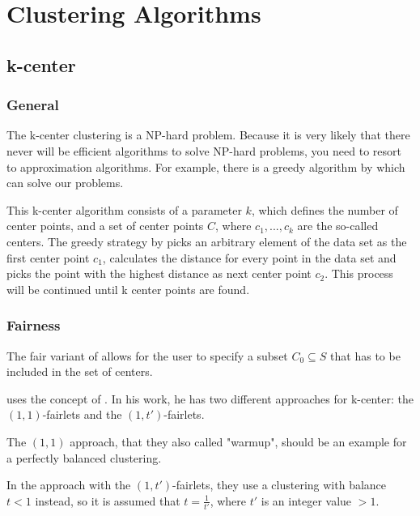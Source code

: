 \section{Clustering Algorithms}
\label{clustering-algorithms}


\subsection{k-center}
\label{k-center}

\subsubsection{General}
The k-center clustering is a NP-hard problem. Because it is very likely that there never will be efficient algorithms to solve NP-hard problems, you need to resort to approximation algorithms.
For example, there is a greedy algorithm by \textcite[]{Gonzalez1985ClusteringDistance} which can solve our problems.

This k-center algorithm consists of a parameter $k$, which defines the number of center points, and a set of center points $C$, where $c_{1},...,c_{k}$ are the so-called centers. \autocite[]{Kleindessner2019FairSummarization}
The greedy strategy by \textcite[]{Gonzalez1985ClusteringDistance} picks an arbitrary element of the data set as the first center point $c_{1}$, calculates the distance for every point in the data set and picks the point with the highest distance as next center point $c_{2}$. This process will be continued until k center points are found.

\subsubsection{Fairness}

The fair variant of \textcite[]{Kleindessner2019FairSummarization} allows for the user to specify a subset $C_{0} \subseteq S$ that has to be included in the set of centers.

\textcite[]{Chierichetti2018} uses the concept of . In his work, he has two different approaches for k-center: the $(1,1)$-fairlets and the $(1,t')$-fairlets.

The $(1,1)$ approach, that they also called "warmup", should be an example for a perfectly balanced clustering. \autocite[6]{Chierichetti2018}

In the approach with the $(1,t')$-fairlets, they use a clustering with balance $t < 1$ instead, so it is assumed that $t = \frac{1}{t'}$, where $t'$ is an integer value $> 1$. \autocite[6]{Chierichetti2018}


